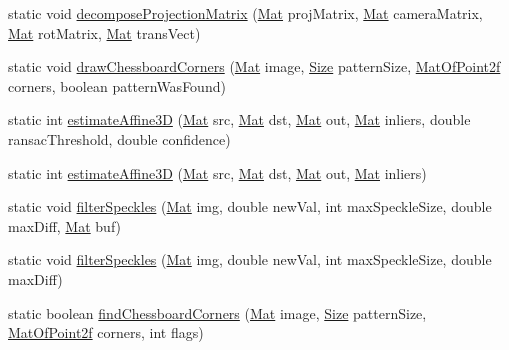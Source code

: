 \begin{DoxyCompactItemize}
\item 
static void \mbox{\hyperlink{classorg_1_1opencv_1_1calib3d_1_1_calib3d_ad9441ef699ef192fda9e5c506d6553e6}{decompose\+Projection\+Matrix}} (\mbox{\hyperlink{classorg_1_1opencv_1_1core_1_1_mat}{Mat}} proj\+Matrix, \mbox{\hyperlink{classorg_1_1opencv_1_1core_1_1_mat}{Mat}} camera\+Matrix, \mbox{\hyperlink{classorg_1_1opencv_1_1core_1_1_mat}{Mat}} rot\+Matrix, \mbox{\hyperlink{classorg_1_1opencv_1_1core_1_1_mat}{Mat}} trans\+Vect)
\item 
static void \mbox{\hyperlink{classorg_1_1opencv_1_1calib3d_1_1_calib3d_a8748d7dc71aff055017971b3f69cb4d1}{draw\+Chessboard\+Corners}} (\mbox{\hyperlink{classorg_1_1opencv_1_1core_1_1_mat}{Mat}} image, \mbox{\hyperlink{classorg_1_1opencv_1_1core_1_1_size}{Size}} pattern\+Size, \mbox{\hyperlink{classorg_1_1opencv_1_1core_1_1_mat_of_point2f}{Mat\+Of\+Point2f}} corners, boolean pattern\+Was\+Found)
\item 
static int \mbox{\hyperlink{classorg_1_1opencv_1_1calib3d_1_1_calib3d_a3b722ac9873a2ce03d1974df1da955c5}{estimate\+Affine3D}} (\mbox{\hyperlink{classorg_1_1opencv_1_1core_1_1_mat}{Mat}} src, \mbox{\hyperlink{classorg_1_1opencv_1_1core_1_1_mat}{Mat}} dst, \mbox{\hyperlink{classorg_1_1opencv_1_1core_1_1_mat}{Mat}} out, \mbox{\hyperlink{classorg_1_1opencv_1_1core_1_1_mat}{Mat}} inliers, double ransac\+Threshold, double confidence)
\item 
static int \mbox{\hyperlink{classorg_1_1opencv_1_1calib3d_1_1_calib3d_af7bf72e6c32472fe5de24cbd8e749435}{estimate\+Affine3D}} (\mbox{\hyperlink{classorg_1_1opencv_1_1core_1_1_mat}{Mat}} src, \mbox{\hyperlink{classorg_1_1opencv_1_1core_1_1_mat}{Mat}} dst, \mbox{\hyperlink{classorg_1_1opencv_1_1core_1_1_mat}{Mat}} out, \mbox{\hyperlink{classorg_1_1opencv_1_1core_1_1_mat}{Mat}} inliers)
\item 
static void \mbox{\hyperlink{classorg_1_1opencv_1_1calib3d_1_1_calib3d_aaf626e5e34382b1b5a594d4790501c20}{filter\+Speckles}} (\mbox{\hyperlink{classorg_1_1opencv_1_1core_1_1_mat}{Mat}} img, double new\+Val, int max\+Speckle\+Size, double max\+Diff, \mbox{\hyperlink{classorg_1_1opencv_1_1core_1_1_mat}{Mat}} buf)
\item 
static void \mbox{\hyperlink{classorg_1_1opencv_1_1calib3d_1_1_calib3d_aa3d550489967c6395ec1ca2f118ee06d}{filter\+Speckles}} (\mbox{\hyperlink{classorg_1_1opencv_1_1core_1_1_mat}{Mat}} img, double new\+Val, int max\+Speckle\+Size, double max\+Diff)
\item 
static boolean \mbox{\hyperlink{classorg_1_1opencv_1_1calib3d_1_1_calib3d_a5a4ea03ae303cf3c5a327ec5c85047a5}{find\+Chessboard\+Corners}} (\mbox{\hyperlink{classorg_1_1opencv_1_1core_1_1_mat}{Mat}} image, \mbox{\hyperlink{classorg_1_1opencv_1_1core_1_1_size}{Size}} pattern\+Size, \mbox{\hyperlink{classorg_1_1opencv_1_1core_1_1_mat_of_point2f}{Mat\+Of\+Point2f}} corners, int flags)

\end{DoxyCompactItemize}
